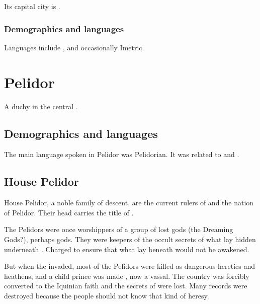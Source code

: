 Its capital city is \Tephar. 





\subsubsection{Demographics and languages}
Languages include \Velcadian{}, \Tepharin{} and occasionally Imetric.















\section{Pelidor}
A duchy in the central .





\subsection{Demographics and languages}
The main language spoken in Pelidor was Pelidorian. 
It was related to \Ortaican and \Tepharin. 







\subsection{House Pelidor}
House Pelidor, a \scathaese{} noble family of \Tepharin{} descent, are the current rulers of \Malcur and the nation of Pelidor. 
Their head carries the title of \quo{\rayuth}.

The Pelidors were once worshippers of a group of lost gods (the Dreaming Gods?), perhaps \Tepharin{} gods. 
They were keepers of the occult secrets of what lay hidden underneath \Malcur. 
Charged to ensure that what lay beneath would not be awakened. 

But when the \Velcadians{} invaded, most of the Pelidors were killed as dangerous heretics and heathens, and a child prince was made \rayuth, now a \Velcadian{} vassal. The country was forcibly converted to the Iquinian faith and the secrets of \Malcur were lost. Many records were destroyed because the people should not know that kind of heresy. 

